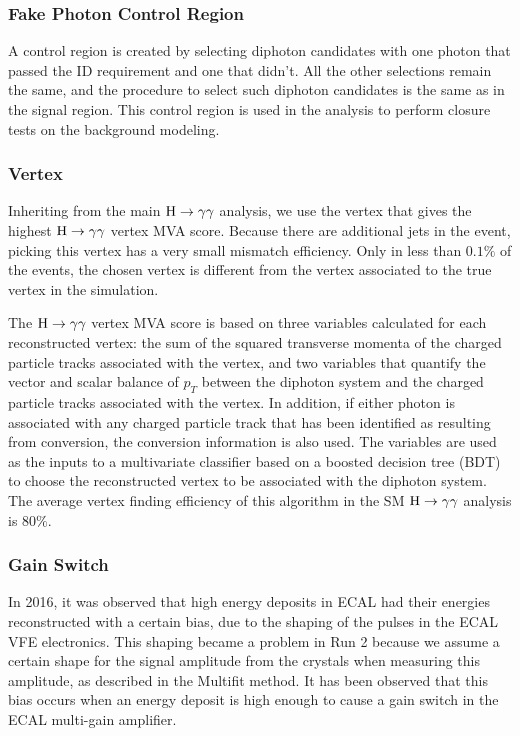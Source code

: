 \subsubsection{Fake Photon Control Region}\label{sec:PCR}
A control region is created by selecting diphoton candidates with one photon that passed the ID requirement and one that didn't. All the other selections remain the same, and the procedure to select such diphoton candidates is the same as in the signal region. This control region is used in the analysis to perform closure tests on the background modeling.

\subsubsection{Vertex}
Inheriting from the main $\mathrm{H}\to\gamma\gamma$ analysis, we use the vertex that gives the highest $\mathrm{H}\to\gamma\gamma$ vertex MVA score. 
Because there are additional jets in the event,  picking this vertex has a very small mismatch efficiency. 
Only in less than $0.1\%$ of the events, the chosen vertex is different from the vertex associated to the true vertex in the simulation. 

The $\mathrm{H}\to\gamma\gamma$ vertex MVA score is based on three variables calculated for each reconstructed vertex: the sum of the squared transverse momenta of the charged particle tracks associated with the vertex, and two variables that quantify the vector and scalar balance of $p_{T}$ between the diphoton system and the charged particle tracks associated with the vertex. 
In addition, if either photon is associated with any charged particle track that has been identified as resulting from conversion, the conversion information is also used. 
The variables are used as the inputs to a multivariate classifier based on a boosted decision tree (BDT) to choose the reconstructed vertex to be associated with the diphoton system. 
The average vertex finding efficiency of this algorithm in the SM $\mathrm{H}\to\gamma\gamma$ analysis is $80\%$.

\subsubsection{Gain Switch}

In 2016, it was observed that high energy deposits in ECAL had their energies reconstructed with a certain bias, due to the shaping of the pulses in the ECAL VFE electronics. 
This shaping became a problem in Run 2 because we assume a certain shape for the signal amplitude from the crystals when measuring this amplitude, as described in the Multifit method. 
It has been observed that this bias occurs when an energy deposit is high enough to cause a gain switch in the ECAL multi-gain amplifier.

